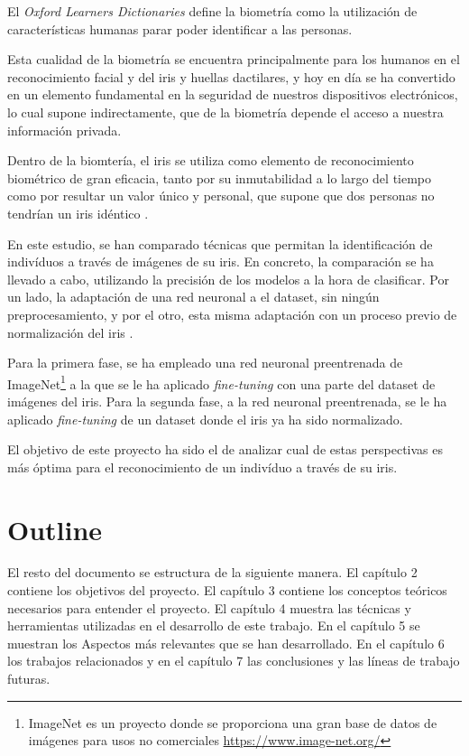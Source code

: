 
El \textit{Oxford Learners Dictionaries} define la biometría como la utilización de características humanas parar poder identificar a las personas.

Esta cualidad de la biometría se encuentra principalmente para los humanos en el reconocimiento facial y del iris y huellas dactilares, y hoy en día
se ha convertido en un elemento fundamental en la seguridad de nuestros dispositivos electrónicos, lo cual supone indirectamente,
que de la biometría depende el acceso a nuestra información privada.

Dentro de la biomtería, el iris se utiliza como elemento de reconocimiento biométrico de gran eficacia, tanto por su inmutabilidad a lo largo del tiempo como por resultar un valor único y 
personal, que supone que dos personas no tendrían un iris idéntico \cite{malgheet_iris_2021}.

En este estudio, se han comparado técnicas que permitan la identificación de indivíduos a través de imágenes de su iris. 
En concreto, la comparación se ha llevado a cabo, utilizando la precisión de los modelos a la hora de clasificar. Por un lado, la adaptación de una red neuronal 
a el dataset, sin ningún preprocesamiento, y por el otro, esta misma adaptación con un proceso previo de normalización del iris .

Para la primera fase, se ha empleado una red neuronal preentrenada de ImageNet\footnote{ImageNet es un proyecto donde se proporciona una gran base de datos de imágenes para usos no comerciales \href{https://www.image-net.org/}{https://www.image-net.org/}} a la que se le ha aplicado \textit{fine-tuning} con una parte del dataset de imágenes del iris.
Para la segunda fase, a la red neuronal preentrenada, se le ha aplicado \textit{fine-tuning} de un dataset donde el iris ya ha sido normalizado.

El objetivo de este proyecto ha sido el de analizar cual de estas perspectivas es más óptima para el reconocimiento de un indivíduo a través de su iris.

\section{Outline}

El resto del documento se estructura de la siguiente manera. El capítulo 2 contiene los objetivos del proyecto. El capítulo 3 contiene los conceptos teóricos necesarios
para entender el proyecto. El capítulo 4 muestra las técnicas y herramientas utilizadas en el desarrollo de este trabajo. En el capítulo 5 se muestran los Aspectos
más relevantes que se han desarrollado. En el capítulo 6 los trabajos relacionados y en el capítulo 7 las conclusiones y las líneas de trabajo futuras.
